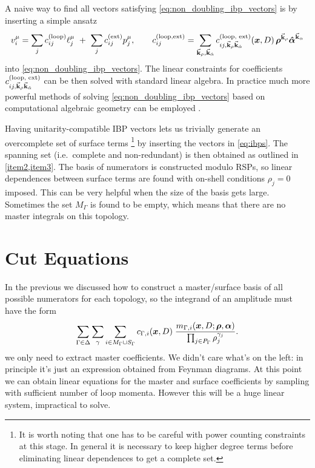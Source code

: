 {
  \def\coeff{c^{(\text{loop, ext})}_{ij,\va{k}_\rho \va{k}_{\hat{\alpha}}}}
  A naive way to find all vectors satisfying \cref{eq:non_doubling_ibp_vectors}
  is by inserting a simple ansatz
  \begin{equation}
    v_i^\mu = \sum_{j}^{}c^{(\text{loop})}_{ij}\ell^\mu_j ~+~  \sum_{j}^{}c^{(\text{ext})}_{ij} p^\mu_j, \qquad
    c_{ij}^{(\text{loop,ext})} = \sum_{\va{k}_\rho, \va{k}_{\hat{\alpha}}} \coeff (\vb*{x},D)\, \vb*{\rho}^{\va{k}_\rho}\vb*{\hat{\alpha}}^{\va{k}_\alpha}
  \end{equation}
  into \cref{eq:non_doubling_ibp_vectors}.
  The linear constraints for coefficients $\coeff$ can be then solved with standard linear algebra.
}%
In practice much more powerful methods of solving \cref{eq:non_doubling_ibp_vectors}  based on computational
algebraic geometry can be employed \cite{Larsen:2015ped,Boehm:2018fpv,Zhang:2016kfo,Abreu:2017xsl,Bendle2019}.

Having unitarity-compatible IBP vectors lets us trivially generate an overcomplete set of surface terms%
\footnote{
  It is worth noting that one has to be careful with power counting constraints at this stage.
  In general it is necessary to keep higher degree terms before eliminating linear dependences to get a complete set.
}
by inserting the vectors in \cref{eq:ibps}.
The spanning set (i.e.\ complete and non-redundant) is then obtained as outlined in \cref{item2,item3}.
The basis of numerators is constructed modulo RSPs, so
linear dependences between surface terms are found with on-shell conditions $\rho_j=0$ imposed.
This can be very helpful when the size of the basis gets large.
Sometimes the set $M_\Gamma$ is found to be empty, which means that there are
no master integrals on this topology.


\section{Cut Equations}
\label{sec:cut_equations}

In the previous  we discussed how to construct a master/surface basis
of all possible numerators for each topology, so the integrand of an amplitude must 
have the form
\begin{equation}
  \sum_{\Gamma \in \Delta} \sum_{\gamma} \sum_{i \in M_\Gamma \cup S_\Gamma}^{} c_{\Gamma, i}(\vb*{x},D) \;
  \frac{m_{\Gamma, i} (\vb*{x},D;\vb*{\rho},\vb*{\alpha}) }%
    {\prod_{j\in P_\Gamma} \rho_j^{\gamma_{j}}}.
\end{equation}
we only need to extract master coefficients.
We didn't care what's on the left: in principle it's just an expression obtained from Feynman diagrams.
At this point we can obtain linear equations for the master and surface coefficients by sampling
with sufficient number of loop momenta. However this will be a huge linear system, impractical to solve.

